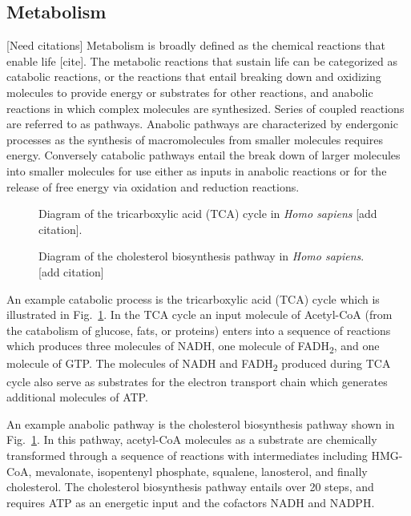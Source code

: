 \begin{DoubleSpace*}
\section{Metabolism} [Need citations]
Metabolism is broadly defined as the chemical reactions that enable life [cite]. The metabolic reactions that sustain life can be categorized as catabolic reactions, or the reactions that entail breaking down and oxidizing molecules to provide energy or substrates for other reactions, and anabolic reactions in which complex molecules are synthesized. Series of coupled reactions are referred to as pathways. Anabolic pathways are characterized by endergonic processes as the synthesis of macromolecules from smaller molecules requires energy. Conversely catabolic pathways entail the break down of larger molecules into smaller molecules for use either as inputs in anabolic reactions or for the release of free energy via oxidation and reduction reactions. 
\begin{figure}[ht!]
	\caption[TCA cycle pathway diagram]{ Diagram of the tricarboxylic acid (TCA) cycle in \emph{Homo sapiens} [add citation].\label{fig:tca} }
\end{figure}

\begin{figure}[ht!]
	\caption[Cholesterol biosynthesis pathway diagram]{ Diagram of the cholesterol biosynthesis pathway in \emph{Homo sapiens}. [add citation] \label{fig:chol} }
\end{figure}

An example catabolic process is the tricarboxylic acid (TCA) cycle which is illustrated in Fig.~\ref{fig:tca}. In the TCA cycle an input molecule of Acetyl-CoA (from the catabolism of glucose, fats, or proteins) enters into a sequence of reactions which produces three molecules of NADH, one molecule of FADH\textsubscript{2}, and one molecule of GTP. The molecules of NADH and FADH\textsubscript{2} produced during TCA cycle also serve as substrates for the electron transport chain which generates additional molecules of ATP. 

An example anabolic pathway is the cholesterol biosynthesis pathway shown in Fig.~\ref{fig:tca}. In this pathway, acetyl-CoA molecules as a substrate are chemically transformed through a sequence of reactions with intermediates including HMG-CoA, mevalonate, isopentenyl phosphate, squalene, lanosterol, and finally cholesterol. The cholesterol biosynthesis pathway entails over 20 steps, and requires ATP as an energetic input and the cofactors NADH and NADPH. 


\end{DoubleSpace*}
